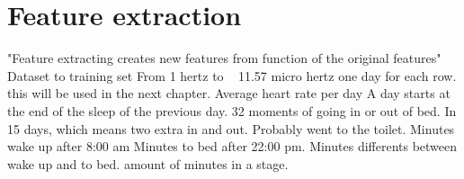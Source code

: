 	\section{Feature extraction}
			"Feature extracting creates new features from function of the original features"
			Dataset to training set
			From 1 hertz to  ~ 11.57 micro hertz 
			one day for each row. this will be used in the next chapter.
			Average heart rate per day
			A day starts at the end of the sleep of the previous day.
			32 moments of going in or out of bed. In 15 days, which means two extra in and out. Probably went to the toilet.
			Minutes wake up after 8:00 am
			Minutes to bed after 22:00 pm.
			Minutes differents between wake up and to bed.
			amount of minutes in a stage.


